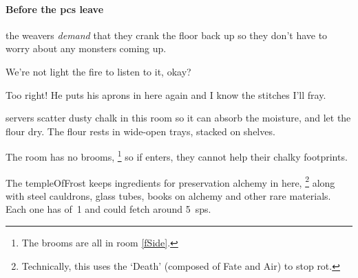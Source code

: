 \begin{multicols}{2}
\paragraph{Before the \glspl{pc} leave}
the \glspl{weaver} \emph{demand} that they crank the floor back up so they don't have to worry about any \glspl{monster} coming up.

\begin{speechtext}
  We're not light the fire to listen to it, okay?

  \vspace{-.4em}

  \vspace{-.4em}

  \vspace{-.3em}


  Too right!
  He puts his aprons in here again and I know the stitches I'll fray.

  \vspace{-.3em}

  \vspace{-.3em}

\end{speechtext}


\Glspl{server} scatter dusty chalk in this room so it can absorb the moisture, and let the flour dry.
The flour rests in wide-open trays, stacked on shelves.

The room has no brooms,%
\footnote{The brooms are all in room \vref{fSide}.}
so if  enters, they cannot help their chalky footprints.


The \gls{templeOfFrost} keeps \glspl{ingredient} for preservation \gls{alchemy} in here,
\footnote{Technically, this uses the `Death'  (composed of Fate and Air) to stop rot.}
along with steel cauldrons, glass tubes, books on \gls{alchemy} and other rare materials.
Each one has  of~1 and could fetch around 5~\glspl{sp}.


\end{multicols}

